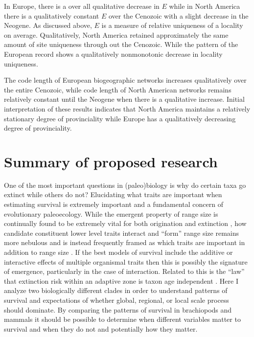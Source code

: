 \documentclass[12pt,letterpaper]{article}
\begin{document}
In Europe, there is a over all qualitative decrease in \(E\) while in North America there is a qualitatively constant \(E\) over the Cenozoic with a slight decrease in the Neogene. As discussed above, \(E\) is a measure of relative uniqueness of a locality on average. Qualitatively, North America retained approximately the same amount of site uniqueness through out the Cenozoic. While the pattern of the European record shows a qualitatively nonmonotonic decrease in locality uniqueness.

The code length of European biogeographic networks increases qualitatively over the entire Cenozoic, while code length of North American networks remains relatively constant until the Neogene when there is a qualitative increase. Initial interpretation of these results indicates that North America maintains a relatively stationary degree of provinciality while Europe has a qualitatively decreasing degree of provinciality. 


\section{Summary of proposed research}
One of the most important questions in (paleo)biology is why do certain taxa go extinct while others do not? Elucidating what traits are important when estimating survival is extremely important and a fundamental concern of evolutionary paleoecology. While the emergent property of range size is continually found to be extremely vital for both origination and extinction \citep{Roy2009c,Foote2013,Jablonski2003,Jablonski1987,Harnik2013}, how candidate constituent lower level traits interact and ``form'' range size remains more nebulous and is instead frequently framed as which traits are important in addition to range size \citep{Foote2013,Harnik2011,Nurnberg2013a}. If the best models of survival include the additive or interactive effects of multiple organismal traits then this is possibly the signature of emergence, particularly in the case of interaction. Related to this is the ``law'' that extinction risk within an adaptive zone is taxon age independent \citep{VanValen1973}. Here I analyze two biologically different clades in order to understand patterns of survival and expectations of whether global, regional, or local scale process should dominate. By comparing the patterns of survival in brachiopods and mammals it should be possible to determine when different variables matter to survival and when they do not and potentially how they matter.
\end{document}
